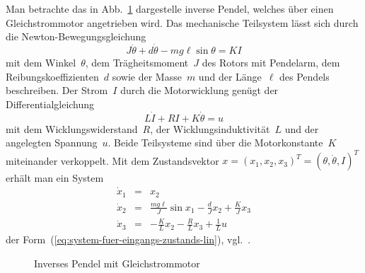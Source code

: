 \begin{example}
\label{exa:inverses-pendel-gleichstrommotor}Man betrachte das in
Abb.~\ref{fig:inverses-pendel-gleichstrommotor} dargestelle inverse
Pendel, welches über einen Gleichstrommotor angetrieben wird. Das
mechanische Teilsystem lässt sich durch die Newton-Bewegungsgleichung
\[
J\ddot{\theta}+d\dot{\theta}-mg\ell\sin\theta=KI
\]
mit dem Winkel~$\theta$, dem Trägheitsmoment~$J$ des Rotors mit
Pendelarm, dem Reibungskoeffizienten~$d$ sowie der Masse~$m$ und
der Länge~$\ell$ des Pendels beschreiben. Der Strom~$I$ durch
die Motorwicklung genügt der Differentialgleichung 
\[
L\dot{I}+RI+K\dot{\theta}=u
\]
mit dem Wicklungswiderstand~$R$, der Wicklungsinduktivität~$L$
und der angelegten Spannung~$u$. Beide Teilsysteme sind über die
Motorkonstante~$K$ miteinander verkoppelt. Mit dem Zustandsvektor
$x=(x_{1},x_{2},x_{3})^{T}=(\theta,\dot{\theta},I)^{T}$ erhält man
ein System
\begin{equation}
\begin{array}{lcl}
\dot{x}_{1} & = & x_{2}\\
\dot{x}_{2} & = & \frac{mg\ell}{J}\sin x_{1}-\frac{d}{J}x_{2}+\frac{K}{J}x_{3}\\
\dot{x}_{3} & = & -\frac{K}{L}x_{2}-\frac{R}{L}x_{3}+\frac{1}{L}u
\end{array}\label{eq:inverses-pendel-motor}
\end{equation}
der Form~(\ref{eq:system-fuer-eingangs-zustands-lin}), vgl.~\cite{zak86,gomez1994}.

\begin{figure}
\begin{centering}
\resizebox{0.45\textwidth}{!}{}
\par\end{centering}
\caption{Inverses Pendel mit Gleichstrommotor\label{fig:inverses-pendel-gleichstrommotor}}
\end{figure}


\end{example}

